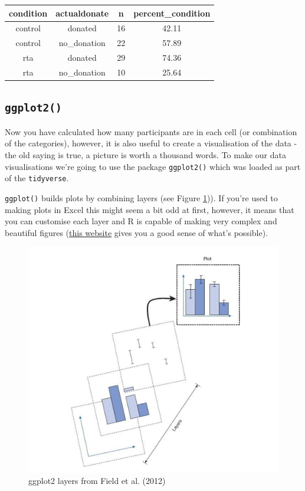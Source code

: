 \documentclass[]{book}
\begin{document}
\begin{tabular}{c|c|c|c}
\hline
condition & actualdonate & n & percent\_condition\\
\hline
control & donated & 16 & 42.11\\
\hline
control & no\_donation & 22 & 57.89\\
\hline
rta & donated & 29 & 74.36\\
\hline
rta & no\_donation & 10 & 25.64\\
\hline
\end{tabular}

\hypertarget{ggplot2}{%
\subsection{\texorpdfstring{\texttt{ggplot2()}}{ggplot2()}}\label{ggplot2}}

Now you have calculated how many participants are in each cell (or combination of the categories), however, it is also useful to create a visualisation of the data - the old saying is true, a picture is worth a thousand words. To make our data visualisations we're going to use the package \texttt{ggplot2()} which was loaded as part of the \texttt{tidyverse}.

\texttt{ggplot()} builds plots by combining layers (see Figure \ref{fig:img-layers})). If you're used to making plots in Excel this might seem a bit odd at first, however, it means that you can customise each layer and R is capable of making very complex and beautiful figures (\href{https://www.data-to-viz.com/}{this website} gives you a good sense of what's possible).

\begin{figure}

{\centering \includegraphics[width=1\linewidth]{images/layers} 

}

\caption{ggplot2 layers from Field et al. (2012)}\label{fig:img-layers}
\end{figure}
\end{document}
